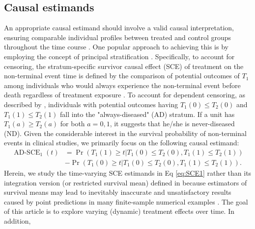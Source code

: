 \documentclass[APA,Times1COL]{WileyNJDv5} %
\theoremstyle{plain}
\def\Pr{\operatorname{Pr}}
\begin{document}
\subsection{Causal estimands}
An appropriate causal estimand should involve a valid causal interpretation, ensuring comparable individual profiles between treated and control groups throughout the time course \citep{Nevo2022semicompeting}. One popular approach to achieving this is by employing the concept of principal stratification \citep{frangakis2002principal,rubin2006causal,ding2011identifiability,dai2012partially}. Specifically, to account for censoring, the stratum-specific survivor causal effect (SCE) of treatment on the non-terminal event time is defined by the comparison of potential outcomes of $T_1$ among individuals who would always experience the non-terminal event before death regardless of treatment exposure \citep{tchetgen2014identification}. To account for dependent censoring, as described by \cite{Nevo2022semicompeting}, individuals with potential outcomes having $T_1(0)\leq T_2(0)$ and $T_1(1)\leq T_2(1)$ fall into the "always-diseased" (AD) stratum. If a unit has $T_1(a)\geq T_2(a)$ for both $a=0,1$, it suggests that he/she is never-diseased (ND). 
Given the considerable interest in the survival probability of non-terminal events in clinical studies, we primarily focus on the following causal estimand:
\begin{equation}
\begin{split}
\operatorname{AD-SCE}_1(t)
&=\Pr(T_1(1)\geq t|T_1(0)\leq T_2(0),T_1(1)\leq T_2(1))\\
&-\Pr(T_1(0)\geq t|T_1(0)\leq T_2(0),T_1(1)\leq T_2(1)).
\label{eq:SCE1}
\end{split}
\end{equation}
Herein, we study the time-varying SCE estimands in Eq \eqref{eq:SCE1} rather than its integration version (or restricted survival mean) defined in \cite{Nevo2022semicompeting} because estimators of survival means may lead to inevitably inaccurate and unsatisfactory results caused by point predictions in many finite-sample numerical examples \citep{graf1999assessment}. The goal of this article is to explore varying  (dynamic) treatment effects over time. In addition, 
\end{document}
